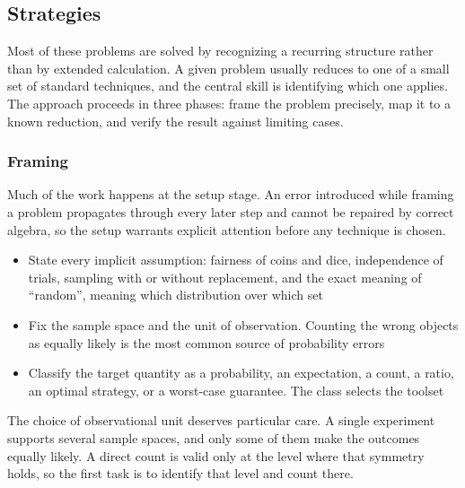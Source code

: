 \subsection{Strategies}

Most of these problems are solved by recognizing a recurring structure rather than by extended calculation. A given problem usually reduces to one of a small set of standard techniques, and the central skill is identifying which one applies. The approach proceeds in three phases: frame the problem precisely, map it to a known reduction, and verify the result against limiting cases. 

\subsubsection{Framing}

Much of the work happens at the setup stage. An error introduced while framing a problem propagates through every later step and cannot be repaired by correct algebra, so the setup warrants explicit attention before any technique is chosen.

\begin{keybox}
\begin{itemize}[itemsep=1ex, label=--]
  \item State every implicit assumption: fairness of coins and dice, independence of trials, sampling with or without replacement, and the exact meaning of ``random'', meaning which distribution over which set
  \item Fix the sample space and the unit of observation. Counting the wrong objects as equally likely is the most common source of probability errors
  \item Classify the target quantity as a probability, an expectation, a count, a ratio, an optimal strategy, or a worst-case guarantee. The class selects the toolset
\end{itemize}
\end{keybox}

The choice of observational unit deserves particular care. A single experiment supports several sample spaces, and only some of them make the outcomes equally likely. A direct count is valid only at the level where that symmetry holds, so the first task is to identify that level and count there.

